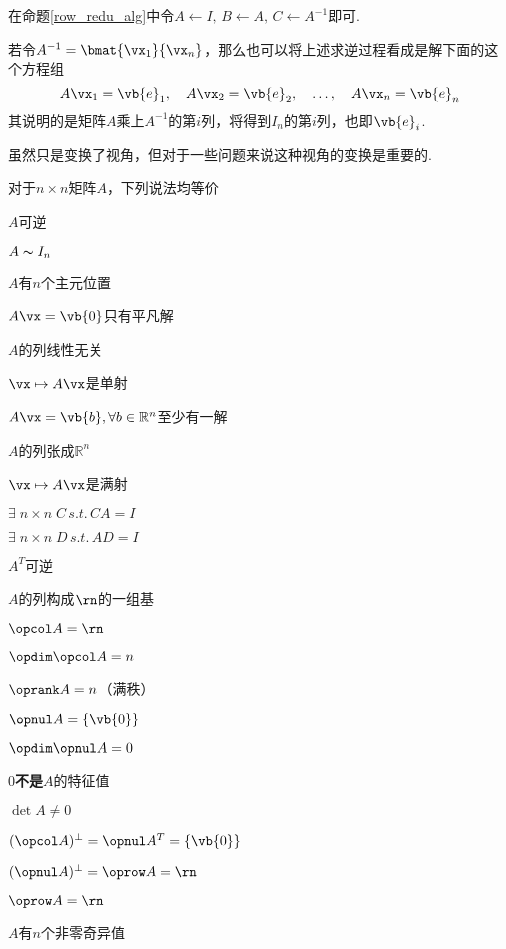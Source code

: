 \begin{analysis}
在命题\ref{row_redu_alg}中令$A\gets I,\,B\gets A,\,C\gets A^{-1}$即可.
\end{analysis}
若令$A^{-1}=\bmat{\vx_1}{\vx_n}$，那么也可以将上述求逆过程看成是解下面的这个方程组
\[A\vx_1=\vb{e}_1,\quad A\vx_2=\vb{e}_2,\quad\dots,\quad A\vx_n=\vb{e}_n\]
其说明的是矩阵$A$乘上$A^{-1}$的第$i$列，将得到$I_n$的第$i$列，也即$\vb{e}_i$.
\par 虽然只是变换了视角，但对于一些问题来说这种视角的变换是重要的.
\newpage
\begin{theorem}[可逆阵定理]
对于$n\times n$矩阵$A$，下列说法均等价
\begin{multicols}{2} %
\begin{partlist}
	\item $A$可逆
	\item $A\thicksim I_n$
	\item $A$有$n$个主元位置
	\item $A\vx=\vb{0}$只有平凡解
	\item $A$的列线性无关
	\item $\vx\mapsto A\vx$是单射
	\item $A\vx=\vb{b},\forall b\in\mathbb{R}^n$至少有一解
	\item $A$的列张成$\mathbb{R}^n$
	\item $\vx\mapsto A\vx$是满射
	\item $\exists\;n\times n\;C\,s.t.\,CA=I$
	\item $\exists\;n\times n\;D\,s.t.\,AD=I$
	\item $A^T$可逆
	\item $A$的列构成$\rn$的一组基
	\item $\opcol A=\rn$
	\item $\opdim\opcol A=n$
	\item $\oprank A=n$（满秩）
	\item $\opnul A=\{\vb{0}\}$
	\item $\opdim\opnul A=0$
	\item $0$\textbf{不是}$A$的特征值
	\item $\det A\ne 0$
	\item $(\opcol A)^\perp=\opnul A^T=\{\vb{0}\}$
	\item $(\opnul A)^\perp=\oprow A=\rn$
	\item $\oprow A=\rn$
	\item $A$有$n$个非零奇异值
\end{partlist}
\end{multicols}
\end{theorem}
